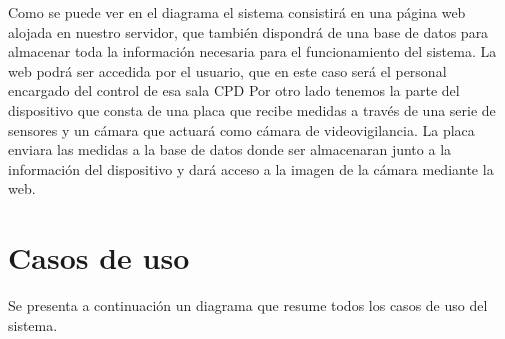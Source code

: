 \begin{figure}[H]
{}
\end{figure}

Como se puede ver en el diagrama el sistema consistirá en una página web alojada en nuestro servidor, que también dispondrá de una base de datos para almacenar toda la información necesaria para el funcionamiento del sistema. La web podrá ser accedida por el usuario, que en este caso será el personal encargado del control de esa sala CPD Por otro lado tenemos la parte del dispositivo que consta de una placa que recibe medidas a través de una serie de sensores y un cámara que actuará como cámara de videovigilancia. La placa enviara las medidas a la base de datos donde ser almacenaran junto a la información del dispositivo y dará acceso a la imagen de la cámara mediante la web.

\section{Casos de uso}
Se presenta a continuación un diagrama que resume todos los casos de uso del sistema.

